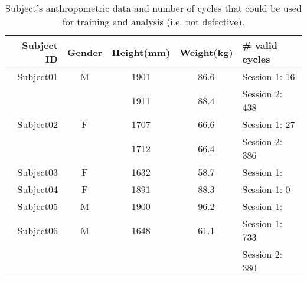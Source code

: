\begin{table}[ht!]
    \centering
    \caption{Subject's anthropometric data and number of cycles that could be used for training and analysis (i.e. not defective).}
    \label{tab:subject-table}
    \small
    \begin{tabular}{r | c c c | l}
        Subject ID  & Gender    & Height(mm)   & Weight(kg)     & \# valid cycles\\ \hline
        Subject01   & M         & 1901          & 86.6          & Session 1: 16 \\
                    &           & 1911          & 88.4          & Session 2: 438 \\ \hline
        Subject02   & F         & 1707          & 66.6          & Session 1: 27 \\
                    &           & 1712          & 66.4          & Session 2: 386 \\ \hline
        Subject03   & F         & 1632          & 58.7          & Session 1: \\ \hline
        Subject04   & F         & 1891          & 88.3          & Session 1: 0 \\ \hline
        Subject05   & M         & 1900          & 96.2          & Session 1: \\ \hline
        Subject06   & M         & 1648          & 61.1          & Session 1: 733 \\
                    &           &               &               & Session 2: 380 \\ \hline
    \end{tabular}
\end{table}